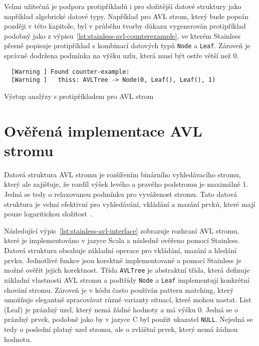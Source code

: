 Velmi užitečná je podpora protipříkladů i pro složitější datové struktury
jako například algebrické datové typy.
Například pro AVL strom, který bude popsán později v této kapitole,
byl v průběhu tvorby důkazu vygenerován protipříklad podobný jako z výpisu~\ref{lst:stainless-avl-counterexample},
ve kterém Stainless přesně popisuje protipříklad s kombinací datových typů \texttt{Node} a \texttt{Leaf}.
Zároveň je správně dodržena podmínka na výšku uzlu, která musí být ostře větší než 0.

\begin{listing}[H]
  \begin{verbatim}
  [Warning ] Found counter-example:
  [Warning ]   thiss: AVLTree -> Node(0, Leaf(), Leaf(), 1)
  \end{verbatim}
  \caption{Výstup analýzy s protipříkladem pro AVL strom}
  \label{lst:stainless-avl-counterexample}
\end{listing}



\section{Ověřená implementace AVL stromu}
\label{sec:stainless-avl}

Datová struktura AVL stromu je rozšířením binárního vyhledávacího stromu,
který ale zajišťuje, že rozdíl výšek levého a pravého podstromu je maximálně 1.
Jedná se tedy o relaxovanou podmínku pro vyváženost stromu.
Tato datová struktura je velmi efektivní pro vyhledávání, vkládání a mazání prvků,
které mají pouze logaritickou složitost~\cite{Pruvodce22}.

Následující výpis~\ref{lst:stainless-avl-interface} zobrazuje rozhraní AVL stromu,
které je implementováno v jazyce Scala a následně ověřeno pomocí Stainless.
Datová struktura obsahuje základní operace pro vkládání, mazání a hledání prvku.
Jednotlivé funkce jsou korektně implementované a pomocí Stainless je možné ověřit jejich korektnost.
Třída \texttt{AVLTree} je abstraktní třída, která definuje základní vlastnosti AVL stromu
a podtřídy \texttt{Node} a \texttt{Leaf} implementují konkrétní chování stromu.
Zároveň je v kódu často používán pattern matching,
který umožňuje elegantně zpracovávat různé varianty situací, které mohou nastat.
List (Leaf) je prázdný uzel, který nemá žádné hodnoty a má výšku 0.
Jedná se o prázdný prvek, podobně jako by v jazyce C byl použit ukazatel \texttt{NULL}.
Nejedná se tedy o poslední platný uzel stromu, ale o zvláštní prvek, který nemá žádnou hodnotu.

